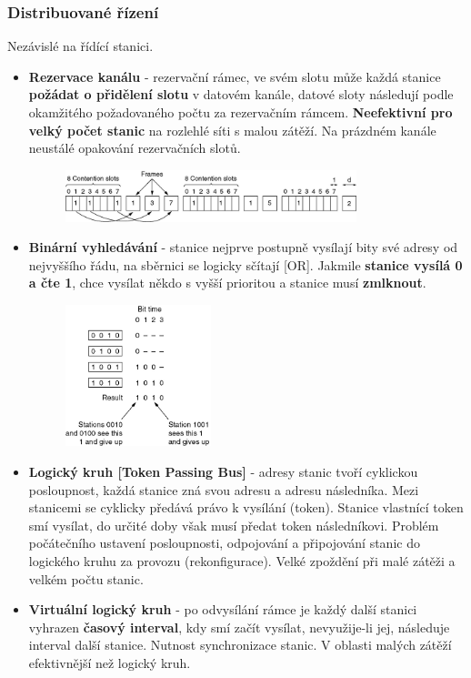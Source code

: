\subsubsection{Distribuované řízení}
Nezávislé na řídící stanici.
\begin{itemize}
	\item \textbf{Rezervace kanálu} - rezervační rámec, ve svém slotu může každá stanice \textbf{požádat o přidělení slotu} v datovém kanále, datové sloty následují podle okamžitého požadovaného počtu za rezervačním rámcem. \textbf{Neefektivní pro velký počet stanic} na rozlehlé síti s malou zátěží. Na prázdném kanále neustálé opakování rezervačních slotů.
	\begin{figure}[H]
		\centering
		\includegraphics[width=0.8\textwidth]{assets/rezervace_kanalu}
	\end{figure}
	\item \textbf{Binární vyhledávání} -  stanice nejprve postupně vysílají bity své adresy od nejvyššího řádu, na sběrnici se logicky sčítají [OR]. Jakmile \textbf{stanice vysílá 0 a čte 1}, chce vysílat někdo s vyšší prioritou a stanice musí \textbf{zmlknout}.
	\begin{figure}[H]
		\centering
		\includegraphics[width=0.4\textwidth]{assets/binarni_vyhledavani}
	\end{figure}
	\item \textbf{Logický kruh [Token Passing Bus]} - adresy stanic tvoří cyklickou posloupnost, každá stanice zná svou adresu a adresu následníka. Mezi stanicemi se cyklicky předává právo k vysílání (token). Stanice vlastnící token smí vysílat, do určité doby však musí předat token následníkovi. Problém počátečního ustavení posloupnosti, odpojování a připojování stanic do logického kruhu za provozu (rekonfigurace). Velké zpoždění při malé zátěži a velkém počtu stanic.
	\item \textbf{Virtuální logický kruh} - po odvysílání rámce je každý další stanici vyhrazen \textbf{časový interval}, kdy smí začít vysílat, nevyužije-li jej, následuje interval další stanice. Nutnost synchronizace stanic. V oblasti malých zátěží efektivnější než logický kruh.
\end{itemize}

